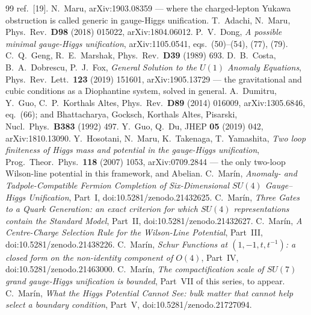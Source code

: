 \documentclass[11pt,a4paper]{article}
\newcommand{\su}[1]{SU(#1)}
\begin{document}
\begin{thebibliography}{99}
ref.~[19].
 N.~Maru, arXiv:1903.08359 --- where the charged-lepton Yukawa obstruction is
called generic in gauge-Higgs unification.
 T.~Adachi, N.~Maru, Phys.\ Rev.\ \textbf{D98} (2018) 015022,
arXiv:1804.06012.
 P.~V.~Dong, \emph{A possible minimal gauge-Higgs unification}, arXiv:1105.0541,
eqs.~(50)--(54), (77), (79).
 C.~Q.~Geng, R.~E.~Marshak, Phys.\ Rev.\ \textbf{D39} (1989) 693.
 D.~B.~Costa, B.~A.~Dobrescu, P.~J.~Fox, \emph{General Solution to the $U(1)$ Anomaly
Equations}, Phys.\ Rev.\ Lett.\ \textbf{123} (2019) 151601, arXiv:1905.13729 --- the gravitational
and cubic conditions as a Diophantine system, solved in general.
 A.~Dumitru, Y.~Guo, C.~P.~Korthals Altes, Phys.\ Rev.\ \textbf{D89} (2014) 016009,
arXiv:1305.6846, eq.~(66); and Bhattacharya, Gocksch, Korthals Altes, Pisarski, Nucl.\ Phys.\
\textbf{B383} (1992) 497.
 Y.~Guo, Q.~Du, JHEP \textbf{05} (2019) 042, arXiv:1810.13090.
\bibitem{HMTY} Y.~Hosotani, N.~Maru, K.~Takenaga, T.~Yamashita, \emph{Two loop finiteness of Higgs
mass and potential in the gauge-Higgs unification}, Prog.\ Theor.\ Phys.\ \textbf{118} (2007) 1053,
arXiv:0709.2844 --- the only two-loop Wilson-line potential in this framework, and Abelian.
\bibitem{PartI} C.~Mar\'in, \emph{Anomaly- and Tadpole-Compatible Fermion Completion of
Six-Dimensional $\su4$ Gauge--Higgs Unification}, Part~I, doi:10.5281/zenodo.21432625.
\bibitem{PartII} C.~Mar\'in, \emph{Three Gates to a Quark Generation: an exact criterion for which
$\su4$ representations contain the Standard Model}, Part~II, doi:10.5281/zenodo.21432627.
\bibitem{PartIII} C.~Mar\'in, \emph{A Centre-Charge Selection Rule for the Wilson-Line Potential},
Part~III, doi:10.5281/zenodo.21438226.
 C.~Mar\'in, \emph{Schur Functions at $(1,-1,t,t^{-1})$: a closed form on the
non-identity component of $O(4)$}, Part~IV, doi:10.5281/zenodo.21463000.
\bibitem{PartVII} C.~Mar\'in, \emph{The compactification scale of $SU(7)$ grand gauge-Higgs
unification is bounded}, Part~VII of this series, to appear.
 C.~Mar\'in, \emph{What the Higgs Potential Cannot See: bulk matter that cannot help
select a boundary condition}, Part~V, doi:10.5281/zenodo.21727094.
\end{thebibliography}
\end{document}
